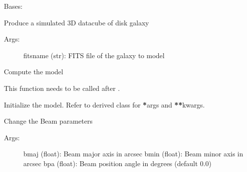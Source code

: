 \documentclass[letterpaper,10pt,english]{sphinxmanual}
\begin{document}

\begin{fulllineitems}
\label{\detokenize{pybb_api:pyBBarolo.pyBBarolo.GalMod}}
Bases: {\hyperref[\detokenize{pybb_api:pyBBarolo.pyBBarolo.Model3D}]{}}

Produce a simulated 3D datacube of disk galaxy
\begin{description}
\item[{Args:}] \leavevmode
fitsname (str): FITS file of the galaxy to model

\end{description}

\begin{fulllineitems}
\label{\detokenize{pybb_api:pyBBarolo.pyBBarolo.GalMod.compute}}
Compute the model

This function needs to be called after {\hyperref[\detokenize{pybb_api:pyBBarolo.pyBBarolo.GalMod.init}]{}}.

\end{fulllineitems}


\begin{fulllineitems}
\label{\detokenize{pybb_api:pyBBarolo.pyBBarolo.GalMod.init}}
Initialize the model. Refer to derived class for {\color{red}\bfseries{}*}args and {\color{red}\bfseries{}**}kwargs.

\end{fulllineitems}


\begin{fulllineitems}
\label{\detokenize{pybb_api:pyBBarolo.pyBBarolo.GalMod.set_beam}}
Change the Beam parameters
\begin{description}
\item[{Args:}] \leavevmode
bmaj (float): Beam major axis in arcsec
bmin (float): Beam minor axis in arcsec
bpa  (float): Beam position angle in degrees (default 0.0)


\end{description}
\end{fulllineitems}
\end{fulllineitems}
\end{document}
